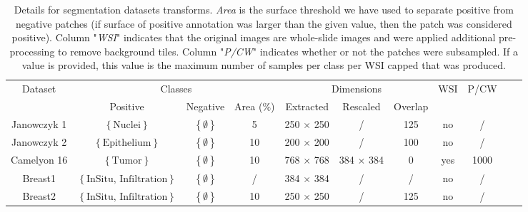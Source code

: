 \begin{table}[t]
  \centering
  \scriptsize
  \begin{tabular}{|c|c|c|c|c|c|c|c|c|c|c|}
  \hline
  \multirow{2}{*}{Dataset} & \multicolumn{3}{c}{Classes} & \multicolumn{3}{|c|}{Dimensions} & \multirow{2}{*}{WSI} & \multirow{2}{*}{P/CW} \\
  \cline{2-7}
  & Positive & Negative & Area {\small($\%$)} & Extracted & Rescaled & Overlap & & \\
  \hline
  Janowczyk 1 & {$\left\{\text{Nuclei}\right\}$} &  {$\left\{\emptyset\right\}$} & 5 & 250 $\times$ 250 & / & 125 & no & / \\
  Janowczyk 2 & {$\left\{\text{Epithelium}\right\}$} &  {$\left\{\emptyset\right\}$} & 10 & 200 $\times$ 200 & / & 100 & no & / \\
  Camelyon 16 & {$\left\{\text{Tumor}\right\}$} &  {$\left\{\emptyset\right\}$} & 10 & 768 $\times$ 768 & 384 $\times$ 384 & 0 & yes & 1000 \\
  Breast1 & {$\left\{\text{InSitu, Infiltration}\right\}$} & {$\left\{\emptyset\right\}$} & / & 384 $\times$ 384 & / & / & no & /\\
  Breast2 & {$\left\{\text{InSitu, Infiltration}\right\}$} & {$\left\{\emptyset\right\}$} & 10 & 250 $\times$ 250 & / & 125 & no & /\\
  \hline
  \end{tabular}
  \caption{Details for segmentation datasets transforms. \textit{Area} is the surface threshold we have used to separate positive from negative patches (if surface of positive annotation was larger than the given value, then the patch was considered positive). Column "\textit{WSI}" indicates that the original images are whole-slide images and were applied additional pre-processing to remove background tiles. Column "\textit{P/CW}" indicates whether or not the patches were subsampled. If a value is provided, this value is the maximum number of samples per class per WSI capped that was produced.}
  \label{app:mtask:tab:details_trans_seg}
\end{table}

